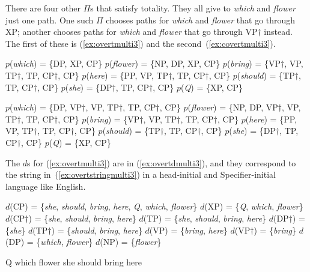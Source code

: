 \documentclass[output=paper]{langsci/langscibook}
\begin{document}
There are four other $\Pi$s that satisfy totality. They all give to \emph{which} and \emph{flower} just one path. One such $\Pi$ chooses paths for \emph{which} and \emph{flower} that go through XP; another chooses paths for \emph{which} and \emph{flower} that go through VP$\dag$ instead. The first of these is (\ref{ex:overtmulti3}) and the second~(\ref{ex:covertmulti3}).
\begin{exe}
	\ex \label{ex:overtmulti3}
	\begin{xlist}
		\ex $p$(\emph{which}) = \{DP, XP, CP\}
		\ex $p$(\emph{flower}) = \{NP, DP, XP, CP\}
		\ex $p$(\emph{bring}) = \{VP$\dag$, VP, TP$\dag$, TP, CP$\dag$, CP\}
		\ex $p$(\emph{here}) = \{PP, VP, TP$\dag$, TP, CP$\dag$, CP\}
		\ex $p$(\emph{should}) = \{TP$\dag$, TP, CP$\dag$, CP\}
		\ex $p$(\emph{she}) = \{DP$\dag$, TP, CP$\dag$, CP\}
		\ex $p$(\emph{Q}) = \{XP, CP\}
	\end{xlist}
	\ex \label{ex:covertmulti3}
	\begin{xlist}
		\ex $p$(\emph{which}) = \{DP, VP$\dag$, VP, TP$\dag$, TP, CP$\dag$, CP\}
		\ex $p$(\emph{flower}) = \{NP, DP, VP$\dag$, VP, TP$\dag$, TP, CP$\dag$, CP\}
		\ex $p$(\emph{bring}) = \{VP$\dag$, VP, TP$\dag$, TP, CP$\dag$, CP\}
		\ex $p$(\emph{here}) = \{PP, VP, TP$\dag$, TP, CP$\dag$, CP\}
		\ex $p$(\emph{should}) = \{TP$\dag$, TP, CP$\dag$, CP\}
		\ex $p$(\emph{she}) = \{DP$\dag$, TP, CP$\dag$, CP\}
		\ex $p$(\emph{Q}) = \{XP, CP\}
	\end{xlist}
\end{exe}

The $d$s for (\ref{ex:overtmulti3}) are in (\ref{ex:overtdmulti3}), and they correspond to the string in~(\ref{ex:overtstringmulti3}) in a head-initial and Specifier-initial language like English.
\begin{exe}
	\ex \label{ex:overtdmulti3}
	\begin{xlist}
		\ex $d$(CP) = \{\emph{she}, \emph{should}, \emph{bring}, \emph{here}, \emph{Q}, \emph{which}, \emph{flower}\}
		\ex $d$(XP) = \{\emph{Q}, \emph{which}, \emph{flower}\}
		\ex $d$(CP$\dag$) = \{\emph{she}, \emph{should}, \emph{bring}, \emph{here}\}
		\ex $d$(TP) = \{\emph{she}, \emph{should}, \emph{bring}, \emph{here}\}
		\ex $d$(DP$\dag$) = \{\emph{she}\}
		\ex $d$(TP$\dag$) = \{\emph{should}, \emph{bring}, \emph{here}\}
		\ex $d$(VP) = \{\emph{bring}, \emph{here}\}
		\ex $d$(VP$\dag$) = \{\emph{bring}\}
		\ex $d$(DP) = \{\emph{which}, \emph{flower}\}
		\ex $d$(NP) = \{\emph{flower}\}
	\end{xlist}
		\ex \label{ex:overtstringmulti3} Q which flower she should bring here
\end{exe}
\end{document}
